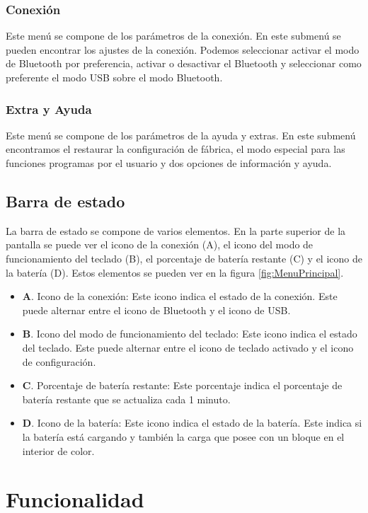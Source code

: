 \subsubsection{Conexión}
Este menú se compone de los parámetros de la conexión. En este submenú se pueden encontrar los ajustes de la conexión. Podemos seleccionar activar el modo de \gls{Bluetooth} por preferencia, activar o desactivar el \gls{Bluetooth} y seleccionar como preferente el modo \gls{USB} sobre el modo \gls{Bluetooth}.

\subsubsection{Extra y Ayuda}
Este menú se compone de los parámetros de la ayuda y extras. En este submenú encontramos el restaurar la configuración de fábrica, el modo especial para las funciones programas por el usuario y dos opciones de información y ayuda.

\subsection{Barra de estado}

La barra de estado se compone de varios elementos. En la parte superior de la pantalla se puede ver el icono de la conexión (A), el icono del modo de funcionamiento del teclado (B), el porcentaje de batería restante (C) y el icono de la batería (D). Estos elementos se pueden ver en la figura \ref{fig:MenuPrincipal}.

\begin{itemize}
    \item \textbf{A}. Icono de la conexión: Este icono indica el estado de la conexión. Este puede alternar entre el icono de \gls{Bluetooth} y el icono de \gls{USB}.
    \item \textbf{B}. Icono del modo de funcionamiento del teclado: Este icono indica el estado del teclado. Este puede alternar entre el icono de teclado activado y el icono de configuración.
    \item \textbf{C}. Porcentaje de batería restante: Este porcentaje indica el porcentaje de batería restante que se actualiza cada 1 minuto.
    \item \textbf{D}. Icono de la batería: Este icono indica el estado de la batería. Este indica si la batería está cargando y también la carga que posee con un bloque en el interior de color.
\end{itemize}

\section{Funcionalidad}

